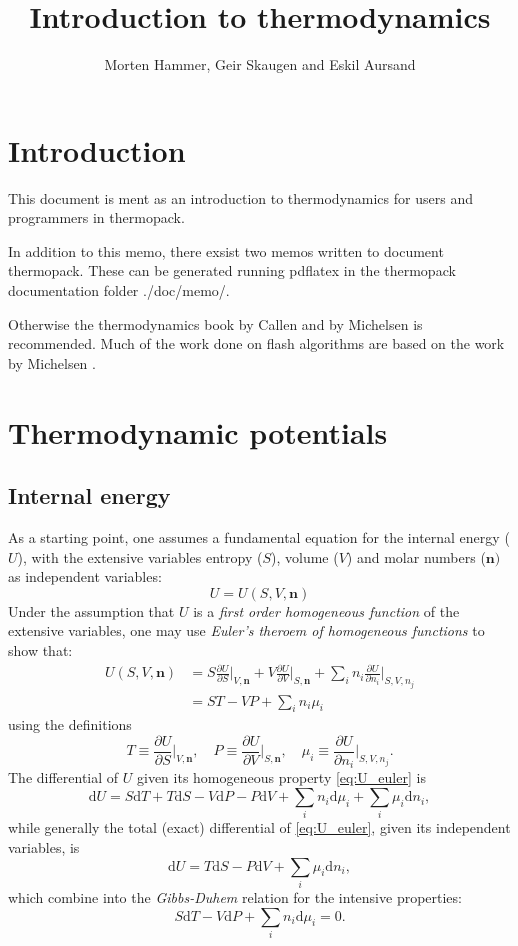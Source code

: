\documentclass[internal,english]{sintefmemo2012}
\title{Introduction to thermodynamics}
\author{Morten Hammer, Geir Skaugen and Eskil Aursand}
\newcommand{\pone}[3]{\frac{\partial #1}{\partial #2}\bigg|_{#3}}%
\newcommand*{\vektor}[1]{\boldsymbol{#1}}%
\newcommand{\dd}[1]{\mathrm{d}{#1}}
\begin{document}
\frontmatter

\tableofcontents

\section{Introduction}
This document is ment as an introduction to thermodynamics for users
and programmers in thermopack.

In addition to this memo, there exsist two memos written to document
thermopack. These can be generated running pdflatex in the thermopack
documentation folder ./doc/memo/.

Otherwise the thermodynamics book by Callen \cite{callen85} and by
Michelsen \cite{michelsen07} is recommended. Much of the work done on
flash algorithms are based on the work by Michelsen
\cite{michelsen82a,michelsen82b,michelsen99}.

\section{Thermodynamic potentials}
\subsection{Internal energy}
As a starting point, one assumes a fundamental equation for the internal energy ($U$), with the extensive variables entropy ($S$), volume ($V$) 
and molar numbers ($\vektor{n})$ as independent variables:
\begin{equation}
  U = U(S,V,\vektor{n})
  \label{}
\end{equation}
Under the assumption that $U$ is a \textit{first order homogeneous function} of the extensive variables, one may use 
\textit{Euler's theroem of homogeneous functions} to show that:
\begin{align}
  U(S,V,\vektor{n}) &= S \pone{U}{S}{V,\vektor{n}}
  +V \pone{U}{V}{S,\vektor{n}}
  +\sum_i n_i \pone{U}{n_i}{S,V,n_j} \nonumber \\
  &= ST - VP + \sum_i n_i \mu_i
  \label{eq:U_euler}
\end{align}
using the definitions 
\begin{equation}
  T \equiv \pone{U}{S}{V,\vektor{n}}, \quad P \equiv \pone{U}{V}{S,\vektor{n}}, \quad \mu_i \equiv \pone{U}{n_i}{S,V,n_j}.
  \label{}
\end{equation}
The differential of $U$ given its homogeneous property \eqref{eq:U_euler} is 
\begin{equation}
  \dd{U} = S\dd{T} + T\dd{S} - V\dd{P} - P\dd{V} + \sum_i n_i \dd{\mu_i} + \sum_i \mu_i \dd{n_i},
  \label{}
\end{equation}
while generally the total (exact) differential of \eqref{eq:U_euler}, given its independent variables, is
\begin{equation}
  \dd{U} = T\dd{S} - P\dd{V} + \sum_i \mu_i \dd{n_i},
  \label{eq:U_totaldiff}
\end{equation}
which combine into the \textit{Gibbs-Duhem} relation for the intensive properties:
\begin{equation}
  S\dd{T} - V\dd{P} + \sum_i n_i \dd{\mu_i} = 0.
  \label{eq:gibbsduhem}
\end{equation}
\end{document}

